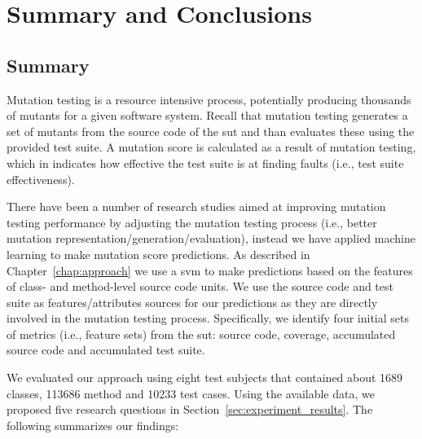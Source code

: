 \chapter{Summary and Conclusions}
\label{chap:conclusions}


\section{Summary}
\label{sec:conclusions_summary}
Mutation testing is a resource intensive process, potentially producing thousands of mutants for a given software system. Recall that mutation testing generates a set of mutants from the source code of the \gls{sut} and than evaluates these using the provided test suite. A mutation score is calculated as a result of mutation testing, which in indicates how effective the test suite is at finding faults (i.e., test suite effectiveness).

There have been a number of research studies aimed at improving mutation testing performance by adjusting the mutation testing process (i.e., better mutation representation/generation/evaluation), instead we have applied machine learning to make mutation score predictions. As described in Chapter~\ref{chap:approach} we use a \gls{svm} to make predictions based on the features of class- and method-level source code units. We use the source code and test suite as features/attributes sources for our predictions as they are directly involved in the mutation testing process. Specifically, we identify four initial sets of metrics (i.e., feature sets) from the \gls{sut}: source code, coverage, accumulated source code and accumulated test suite.

We evaluated our approach using eight test subjects that contained about 1689 classes, 113686 method and 10233 test cases. Using the available data, we proposed five research questions in Section~\ref{sec:experiment_results}. The following summarizes our findings:


